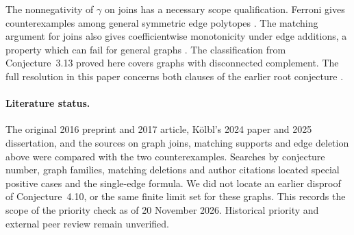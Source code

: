 \documentclass[11pt,a4paper]{article}
\theoremstyle{definition}\newtheorem{problem}[theorem]{Problem}
\begin{document}
The nonnegativity of $\gamma$ on joins has a necessary scope qualification. Ferroni gives counterexamples among general symmetric edge polytopes \cite{Ferroni}. The matching argument for joins also gives coefficientwise monotonicity under edge additions, a property which can fail for general graphs \cite[Example~3.9]{DJKV}. The classification from Conjecture~3.13 proved here covers graphs with disconnected complement. The full resolution in this paper concerns both clauses of the earlier root conjecture \cite{HKM}.

\paragraph{Literature status.}
The original 2016 preprint and 2017 article, K\"olbl's 2024 paper and 2025 dissertation, and the sources on graph joins, matching supports and edge deletion above were compared with the two counterexamples. Searches by conjecture number, graph families, matching deletions and author citations located special positive cases and the single-edge formula. We did not locate an earlier disproof of Conjecture~4.10, or the same finite limit set for these graphs. This records the scope of the priority check as of 20 November 2026. Historical priority and external peer review remain unverified.
\end{document}
